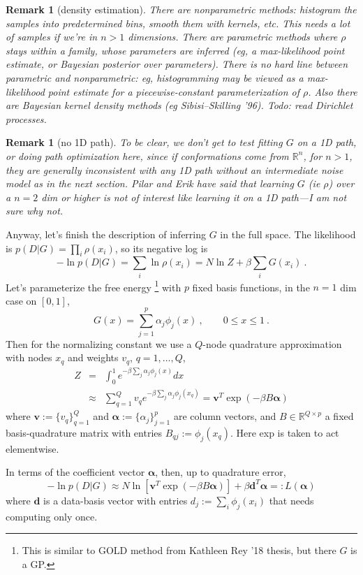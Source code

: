 \documentclass[10pt]{article}
\newcommand{\be}{\begin{equation}}
\newcommand{\ee}{\end{equation}}
\newcommand{\bea}{\begin{eqnarray}}
\newcommand{\eea}{\end{eqnarray}}
\newcommand{\mbf}[1]{{\mathbf #1}}
\newcommand{\R}{\mathbb{R}}
\newtheorem{rmk}[thm]{Remark}
\newcommand{\al}{\alpha}
\newcommand{\bt}{\beta}
\newcommand{\bal}{{\bm\alpha}}
\begin{document}
\begin{rmk}[density estimation]
There are nonparametric methods: histogram the samples into predetermined bins,
smooth them with kernels, etc.
This needs a lot of samples if we're in $n>1$ dimensions.
There are parametric methods where $\rho$ stays within
a family, whose parameters are inferred (eg, a max-likelihood
point estimate, or Bayesian posterior over parameters).
There is no hard line between parametric and nonparametric:
eg, histogramming may be viewed as a max-likelihood point estimate
for a piecewise-constant parameterization of $\rho$.
Also there are Bayesian kernel density methods (eg Sibisi--Skilling '96).
Todo: read Dirichlet processes.
\end{rmk}

\begin{rmk}[no 1D path]
To be clear, we don't get to test fitting $G$ on a 1D path, or doing path optimization here, since if conformations
come from $\R^n$, for $n>1$, they are generally inconsistent with any 1D path
without an intermediate noise model as in the next section.
Pilar and Erik have said
that learning $G$ (ie $\rho$) over a $n=2$ dim or higher
is not of interest like learning it on a 1D path---I am not sure why not.
\end{rmk}

Anyway, let's finish the description of inferring $G$ in the full space.
The likelihood is $p(D|G) = \prod_i \rho(x_i)$, so its negative log is
\be
-\ln p(D|G) = \sum_i \ln \rho(x_i) = N \ln Z + \bt \sum_i G(x_i)~.
\label{nll}
\ee
Let's parameterize the free energy
\footnote{This is similar to GOLD method from Kathleen Rey '18 thesis, but
  there $G$ is a GP.}
with $p$ fixed basis functions,
in the $n=1$ dim case on $[0,1]$,
\be
G(x) = \sum_{j=1}^p \al_j \phi_j(x)~,\qquad  0\le x \le 1~.
\label{basis}
\ee
Then
for the normalizing constant
we use a $Q$-node quadrature approximation
with nodes $x_q$ and weights $v_q$, $q=1,\dots,Q$,
\bea
Z &= &\int_0^1 e^{-\bt \sum_j \al_j \phi_j(x)} dx
\label{Z1}
\\
&\approx&
\sum_{q=1}^Q v_q e^{-\bt \sum_j \al_j \phi_j(x_q)} = 
\mbf{v}^T \exp (-\bt B \bal)
\eea
where $\mbf{v} := \{v_q\}_{q=1}^Q$
and $\bal := \{\al_j\}_{j=1}^p$
are column vectors, and
$B \in \R^{Q\times p}$ a fixed basis-quadrature matrix with entries
$B_{qj}:= \phi_j(x_q)$. Here exp is taken to act elementwise.

In terms of the coefficient vector $\bal$, then, up to quadrature
error,
\be
- \ln p(D|G) \approx
N \ln [\mbf{v}^T \exp (-\bt B \bal)]
+ \bt \mbf{d}^T \bal
\label{nllbas}
=: L(\bal)
\ee
where $\mbf{d}$ is a data-basis vector with entries
$d_j := \sum_i \phi_j(x_i)$ that needs computing only once.
\end{document}
